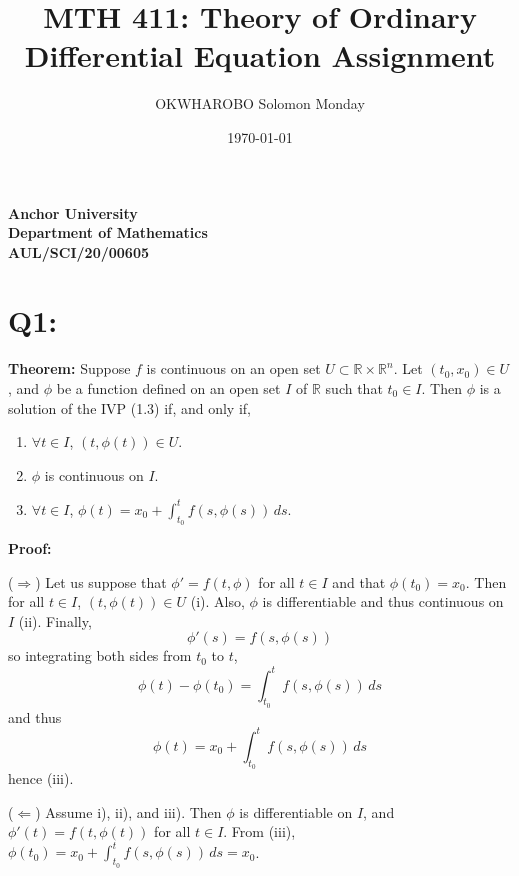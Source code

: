 \documentclass[12pt]{article}
\title{MTH 411: Theory of Ordinary Differential Equation Assignment}
\author{OKWHAROBO Solomon Monday}
\date{\today}
\begin{document}
\maketitle

\thispagestyle{empty} %

\begin{center}
    \vspace{6cm}
    \textbf{Anchor University} \\
    \textbf{Department of Mathematics} \\
    \textbf{AUL/SCI/20/00605}
\end{center}





\newpage

\setcounter{page}{1} %

\section{Q1:}
\textbf{Theorem:}
Suppose $f$ is continuous on an open set $U \subset \mathbb{R} \times \mathbb{R}^n$. Let $(t_0, x_0) \in U$, and $\phi$ be a function defined on an open set $I$ of $\mathbb{R}$ such that $t_0 \in I$. Then $\phi$ is a solution of the IVP (1.3) if, and only if,

\begin{enumerate}
    \item $\forall t \in I$, $(t, \phi(t)) \in U$.
    \item $\phi$ is continuous on $I$.
    \item $\forall t \in I$, $\phi(t) = x_0 + \int_{t_0}^{t} f(s, \phi(s)) \, ds$.
\end{enumerate}

\textbf{Proof:}

\noindent (\textbf{$\Rightarrow$}) Let us suppose that $\phi' = f(t, \phi)$ for all $t \in I$ and that $\phi(t_0) = x_0$. Then for all $t \in I$, $(t, \phi(t)) \in U$ (i). Also, $\phi$ is differentiable and thus continuous on $I$ (ii). Finally,
\[\phi'(s) = f(s, \phi(s))\]
so integrating both sides from $t_0$ to $t$,
\[\phi(t) - \phi(t_0) = \int_{t_0}^{t} f(s, \phi(s)) \, ds\]
and thus
\[\phi(t) = x_0 + \int_{t_0}^{t} f(s, \phi(s)) \, ds\]
hence (iii).

\noindent (\textbf{$\Leftarrow$}) Assume i), ii), and iii). Then $\phi$ is differentiable on $I$, and $\phi'(t) = f(t, \phi(t))$ for all $t \in I$.
From (iii), $\phi(t_0) = x_0 + \int_{t_0}^{t} f(s, \phi(s)) \, ds = x_0$.
\end{document}
